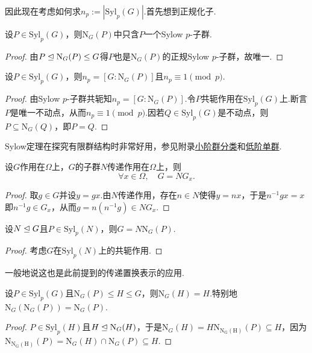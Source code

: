 因此现在考虑如何求$n_p:=|\mathrm{Syl}_p(G)|$.首先想到正规化子.
\begin{lemma*}
	设$P\in\mathrm{Syl}_p(G)$，则$\mathrm{N}_G(P)$中只含$P$一个Sylow $p$-子群.
\end{lemma*}
\begin{proof}
	由$P\trianglelefteq\mathrm{N}_G(P)\le G$得$P$也是$\mathrm{N}_G(P)$的正规Sylow $p$-子群，故唯一.
\end{proof}
\begin{thm}[(Sylow第三定理)]
	设$P\in\mathrm{Syl}_p(G)$，则$n_p=[G:\mathrm{N}_G(P)]$且$n_p\equiv 1\pmod{p}$.
\end{thm}
\begin{proof}
	由Sylow $p$-子群共轭知$n_p=[G:\mathrm{N}_G(P)]$.令$P$共轭作用在$\mathrm{Syl}_p(G)$上.断言$P$是唯一不动点，从而$n_p\equiv 1\pmod{p}$.因若$Q\in\mathrm{Syl}_p(G)$是不动点，则$P\subseteq\mathrm{N}_G(Q)$，即$P=Q$.
\end{proof}

Sylow定理在探究有限群结构时非常好用，参见附录\hyperref[subsec:ClassificationSmallOrder]{小阶群分类}和\hyperref[subsec:SimpleGrpLowOrder]{低阶单群}.
\begin{prop}[(Frattini)]
	设$G$作用在$\Omega$上，$G$的子群$N$传递作用在$\Omega$上，则
	\[
		\forall x\in\Omega,\quad G=NG_x.
	\]
\end{prop}
\begin{proof}
	取$g\in G$并设$y=gx$.由$N$传递作用，存在$n\in N$使得$y=nx$，于是$n^{-1}gx=x$即$n^{-1}g\in G_x$，从而$g=n(n^{-1}g)\in NG_x$.
\end{proof}
\begin{cor*}[(Frattini)]
	设$N\trianglelefteq G$且$P\in\mathrm{Syl}_p(N)$，则$G=N\mathrm{N}_G(P)$.
\end{cor*}
\begin{proof}
	考虑$G$在$\mathrm{Syl}_p(N)$上的共轭作用.
\end{proof}
\begin{remark}
	一般地说这也是此前提到的传递置换表示的应用.
\end{remark}
\begin{cor*}
	设$P\in\mathrm{Syl}_p(G)$且$\mathrm{N}_G(P)\le H\le G$，则$\mathrm{N}_G(H)=H$.特别地$\mathrm{N}_G(\mathrm{N}_G(P))=\mathrm{N}_G(P)$.
\end{cor*}
\begin{proof}
	$P\in\mathrm{Syl}_p(H)$且$H\trianglelefteq\mathrm{N}_G(H)$，于是$\mathrm{N}_G(H)=H\mathrm{N}_{\mathrm{N_G(H)}}(P)\subseteq H$，因为$\mathrm{N}_{\mathrm{N_G(H)}}(P)=\mathrm{N}_G(H)\cap\mathrm{N}_G(P)\subseteq H$.
\end{proof}

